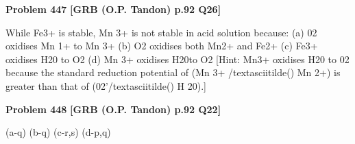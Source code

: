 \begin{problembox}
\textbf{Problem 447} \hfill \textbf{[GRB (O.P. Tandon) p.92 Q26]}
\label{q:ext-grb_all_questions-447}

While Fe3+ is stable, Mn 3+ is not stable in acid solution 
because: 
(a) 02 oxidises Mn 1+ to Mn 3+ 
(b) O2 oxidises both Mn2+ and Fe2+ 
(c) Fe3+ oxidises H20 to O2 
(d) Mn 3+ oxidises H20to O2 
[Hint: Mn3+ oxidises H20 to 02 because the standard reduction 
potential of (Mn 3+ /textasciitilde() 
Mn 2+) is greater than that of 
(02'/textasciitilde() H 20).]
\end{problembox}

\begin{problembox}
\textbf{Problem 448} \hfill \textbf{[GRB (O.P. Tandon) p.92 Q22]}
\label{q:ext-grb_all_questions-448}

(a-q) (b-q) (c-r,s) (d-p,q)
\end{problembox}